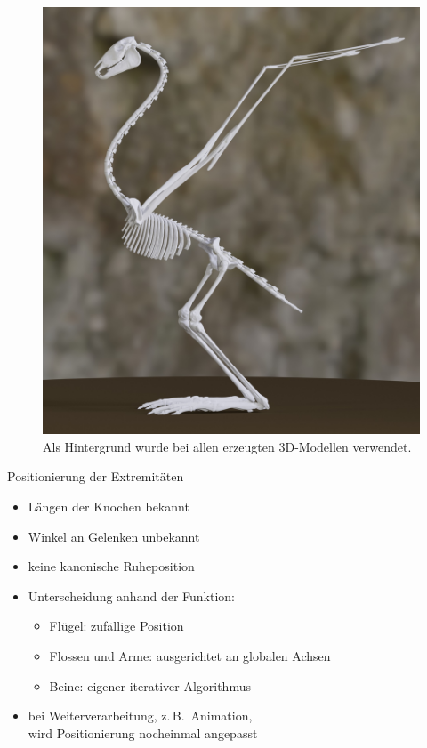 \documentclass{beamer}
\newcommand{\zb}{z.\,B.\ }
\begin{document}
\begin{frame}[focus]
 \begin{figure}
  \centering
  \includegraphics[height=0.85\textheight]{../../java_skeleton_generation/example_skeletons/bird.jpg}
  \caption{\scriptsize Als Hintergrund wurde bei allen erzeugten 3D-Modellen \cite{background} verwendet.}
 \end{figure}
\end{frame}

\begin{frame}{Positionierung der Extremitäten}
 \begin{itemize}
  \item Längen der Knochen bekannt
  \item Winkel an Gelenken unbekannt
  \item keine kanonische Ruheposition
  \item Unterscheidung anhand der Funktion:
  \begin{itemize}
   \item Flügel: zufällige Position
   \item Flossen und Arme: ausgerichtet an globalen Achsen
   \item Beine: eigener iterativer Algorithmus
  \end{itemize}
  \item bei Weiterverarbeitung, \zb Animation,\\ wird Positionierung nocheinmal angepasst
 \end{itemize}
\end{frame}
\end{document}
